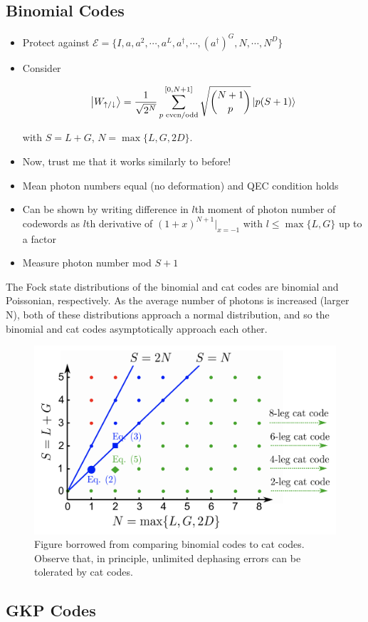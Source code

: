 \documentclass[12]{amsart}
\newcommand\0{\mathbf{0}}
\newcommand\<{\langle}
\renewcommand\>{\rangle}
\begin{document}
\subsection{Binomial Codes}

\begin{itemize}
\item Protect against $\mathcal{E} = \{I, a, a^2, \cdots, a^L, a^\dag, \cdots, (a^\dag)^G, N, \cdots, N^D \}$
\item Consider

$$
\ket{W_{\uparrow / \downarrow}} = \frac{1}{\sqrt{2^N}} \sum_{ p\text{ even/odd}}^{[0, N+1]} \sqrt{\binom{N+1}{ p }} \ket{p(S+1)}
$$

with $S = L+G$, $N = \max\{L, G, 2D\}$.

\item Now, trust me that it works similarly to before!
\item Mean photon numbers equal (no deformation) and QEC condition holds
\item Can be shown by writing difference in $l$th moment of photon number of codewords as $l$th derivative of $(1+x)^{N+1}\vert_{x=-1}$ with $l \leq \max\{L, G\}$ up to a factor
\item Measure photon number mod $S+1$
\end{itemize}

The Fock state distributions of the binomial and cat codes are binomial and Poissonian, respectively. As the average number of photons is increased (larger N), both of these distributions approach a normal distribution, and so the binomial and cat codes asymptotically approach each other. 

\begin{figure}[H]
\centering
\includegraphics[width=0.5\linewidth,keepaspectratio]{binom_cat.png}	
\caption{Figure borrowed from \cite{michael2016new} comparing binomial codes to cat codes. Observe that, in principle, unlimited dephasing errors can be tolerated by cat codes.}
\end{figure}

\subsection{GKP Codes}
\end{document}
